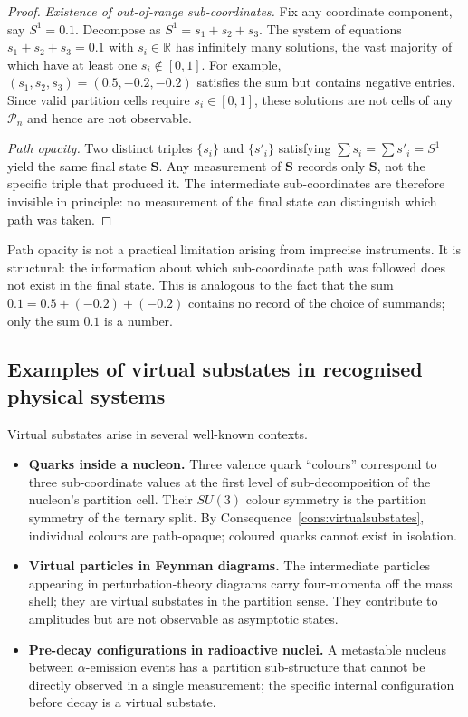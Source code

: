 \begin{proof}
\emph{Existence of out-of-range sub-coordinates.}  Fix any coordinate
component, say $S^{1}=0.1$.  Decompose as $S^{1}=s_{1}+s_{2}+s_{3}$.  The
system of equations $s_{1}+s_{2}+s_{3}=0.1$ with $s_{i}\in\mathbb{R}$ has
infinitely many solutions, the vast majority of which have at least one
$s_{i}\notin[0,1]$.  For example, $(s_{1},s_{2},s_{3})=(0.5,-0.2,-0.2)$
satisfies the sum but contains negative entries.  Since valid partition cells
require $s_{i}\in[0,1]$, these solutions are not cells of any
$\mathcal{P}_{n}$ and hence are not observable.

\emph{Path opacity.}  Two distinct triples $\{s_{i}\}$ and $\{s'_{i}\}$
satisfying $\sum s_{i}=\sum s'_{i}=S^{1}$ yield the same final state
$\mathbf{S}$.  Any measurement of $\mathbf{S}$ records only $\mathbf{S}$, not
the specific triple that produced it.  The intermediate sub-coordinates are
therefore invisible in principle: no measurement of the final state can
distinguish which path was taken.
\end{proof}

\begin{remark}
Path opacity is not a practical limitation arising from imprecise instruments.
It is structural: the information about which sub-coordinate path was followed
does not exist in the final state.  This is analogous to the fact that the sum
$0.1=0.5+(-0.2)+(-0.2)$ contains no record of the choice of summands; only
the sum $0.1$ is a number.
\end{remark}

\subsection{Examples of virtual substates in recognised physical systems}
\label{subsec:virtualexamples}

Virtual substates arise in several well-known contexts.

\begin{itemize}
\item \textbf{Quarks inside a nucleon.}  Three valence quark ``colours''
  correspond to three sub-coordinate values at the first level of
  sub-decomposition of the nucleon's partition cell.  Their $SU(3)$ colour
  symmetry is the partition symmetry of the ternary split.  By
  Consequence~\ref{cons:virtualsubstates}, individual colours are path-opaque;
  coloured quarks cannot exist in isolation.

\item \textbf{Virtual particles in Feynman diagrams.}  The intermediate
  particles appearing in perturbation-theory diagrams carry four-momenta off
  the mass shell; they are virtual substates in the partition sense.  They
  contribute to amplitudes but are not observable as asymptotic states.

\item \textbf{Pre-decay configurations in radioactive nuclei.}  A metastable
  nucleus between $\alpha$-emission events has a partition sub-structure that
  cannot be directly observed in a single measurement; the specific
  internal configuration before decay is a virtual substate.
\end{itemize}

